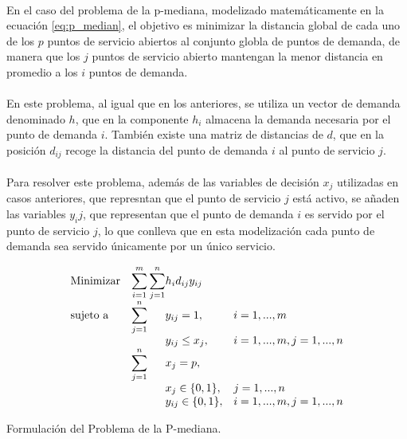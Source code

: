 \documentclass[spanish]{article}
\begin{document}
		\paragraph{}
		En el caso del problema de la p-mediana, modelizado matemáticamente en la ecuación \ref{eq:p_median}, el objetivo es minimizar la distancia global de cada uno de los $p$ puntos de servicio abiertos al conjunto globla de puntos de demanda, de manera que los $j$ puntos de servicio abierto mantengan la menor distancia en promedio a los $i$ puntos de demanda.

		\paragraph{}
		En este problema, al igual que en los anteriores, se utiliza un vector de demanda denominado $h$, que en la componente $h_{i}$ almacena la demanda necesaria por el punto de demanda $i$. También existe una matriz de distancias de $d$, que en la posición $d_{ij}$ recoge la distancia del punto de demanda $i$ al punto de servicio $j$.

		\paragraph{}
		Para resolver este problema, además de las variables de decisión $x_j$ utilizadas en casos anteriores, que represntan que el punto de servicio $j$ está activo, se añaden las variables $y_ij$, que representan que el punto de demanda $i$ es servido por el punto de servicio $j$, lo que conlleva que en esta modelización cada punto de demanda sea servido únicamente por un único servicio.


		\begin{eqfloat}
			\begin{equation}
				\begin{array}{ll@{}ll}
					\text{Minimizar}
						& \displaystyle\sum\limits_{i = 1}^m
							\displaystyle\sum\limits_{j = 1}^n	& h_i d_{ij} y_{ij}	&							\\
					\text{sujeto a}
						& \displaystyle\sum\limits_{j = 1}^n 	& y_{ij} = 1,		& i = 1,..., m	\\
						& 																	 	& y_{ij} \leq x_{j},  		& i=1 ,..., m,j=1 ,..., n  \\
						& \displaystyle\sum\limits_{j = 1}^n 	& x_{j} = p,  		& 						\\
						&                                     &	x_{j} \in \{0,1\},&j=1 ,..., n 	\\
						&                                     &	y_{ij} \in \{0,1\},&i=1 ,..., m, j=1 ,..., n  \\
				\end{array}
			\end{equation}
			\caption{Formulación del Problema de la P-mediana.}
      \label{eq:p_median}
    \end{eqfloat}
\end{document}
